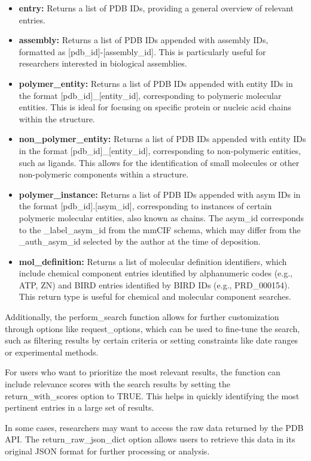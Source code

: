 \begin{itemize}
\item
  \textbf{entry:} Returns a list of PDB IDs, providing a general overview of relevant entries.
\item
  \textbf{assembly:} Returns a list of PDB IDs appended with assembly IDs, formatted as {[}pdb\_id{]}-{[}assembly\_id{]}. This is particularly useful for researchers interested in biological assemblies.
\item
  \textbf{polymer\_entity:} Returns a list of PDB IDs appended with entity IDs in the format {[}pdb\_id{]}\_{[}entity\_id{]}, corresponding to polymeric molecular entities. This is ideal for focusing on specific protein or nucleic acid chains within the structure.
\item
  \textbf{non\_polymer\_entity:} Returns a list of PDB IDs appended with entity IDs in the format {[}pdb\_id{]}\_{[}entity\_id{]}, corresponding to non-polymeric entities, such as ligands. This allows for the identification of small molecules or other non-polymeric components within a structure.
\item
  \textbf{polymer\_instance:} Returns a list of PDB IDs appended with asym IDs in the format {[}pdb\_id{]}.{[}asym\_id{]}, corresponding to instances of certain polymeric molecular entities, also known as chains. The asym\_id corresponds to the \_label\_asym\_id from the mmCIF schema, which may differ from the \_auth\_asym\_id selected by the author at the time of deposition.
\item
  \textbf{mol\_definition:} Returns a list of molecular definition identifiers, which include chemical component entries identified by alphanumeric codes (e.g., ATP, ZN) and BIRD entries identified by BIRD IDs (e.g., PRD\_000154). This return type is useful for chemical and molecular component searches.
\end{itemize}

Additionally, the perform\_search function allows for further customization through options like request\_options, which can be used to fine-tune the search, such as filtering results by certain criteria or setting constraints like date ranges or experimental methods.

For users who want to prioritize the most relevant results, the function can include relevance scores with the search results by setting the return\_with\_scores option to TRUE. This helps in quickly identifying the most pertinent entries in a large set of results.

In some cases, researchers may want to access the raw data returned by the PDB API. The return\_raw\_json\_dict option allows users to retrieve this data in its original JSON format for further processing or analysis.

